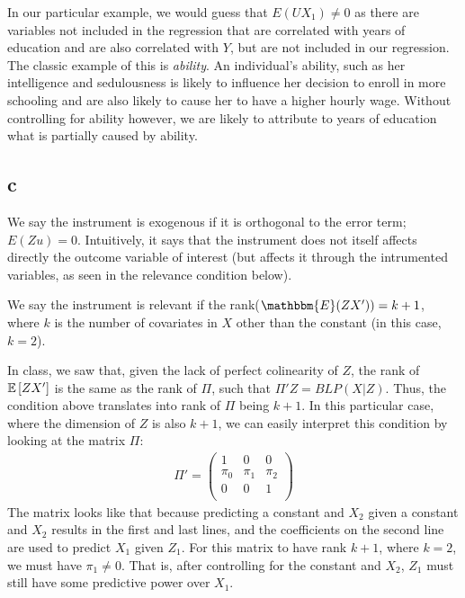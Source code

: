 \documentclass[12pt]{paper}
\begin{document}
In our particular example, we would guess that $E(U X_1)\neq 0$ as there are variables not included in the regression that are correlated with years of education and are also correlated with $Y$, but are not included in our regression. The classic example of this is \textit{ability}. An individual's ability, such as her intelligence and sedulousness is likely to influence her decision to enroll in more schooling and are also likely to cause her to have a higher hourly wage. Without controlling for ability however, we are likely to attribute to years of education what is partially caused by ability. \par 

\subsection*{c} We say the instrument is exogenous if it is orthogonal to the error term; $E(Zu) = 0$. Intuitively, it says that the instrument does not itself affects directly the outcome variable of interest (but affects it through the intrumented variables, as seen in the relevance condition below).

We say the instrument is relevant if the rank($\mathbbm{E}(ZX')) = k+1$, where $k$ is the number of covariates in $X$ other than the constant (in this case, $k=2$). 

In class, we saw that, given the lack of perfect colinearity of $Z$, the rank of $\mathbb{E} \left [ ZX' \right ]$ is the same as the rank of $\Pi$, such that $\Pi'Z=BLP(X|Z)$. Thus, the condition above translates into rank of $\Pi$ being $k+1$. In this particular case, where the dimension of $Z$ is also $k+1$, we can easily interpret this condition by looking at the matrix $\Pi$:
\begin{align*}
\Pi'=\begin{pmatrix}
1&0&0\\
\pi_0&\pi_1&\pi_2\\
0&0&1\\
\end{pmatrix}
\end{align*}
\noindent The matrix looks like that because predicting a constant and $X_2$ given a constant and $X_2$  results in the first and last lines, and the coefficients on the second line are used to predict $X_1$ given $Z_1$. For this matrix to have rank $k+1$, where $k=2$, we must have $\pi_1\ne0$. That is, after controlling for the constant and $X_2$, $Z_1$ must still have some predictive power over $X_1$.
\end{document}

